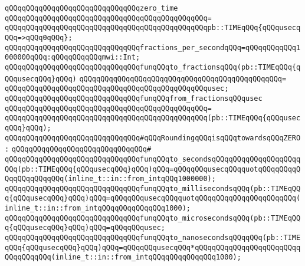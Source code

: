 \verb|qQQqqQQqqQQqqQQqqQQqqQQqqQQqqQQqzero_time|\newline
\verb|qQQqqQQqqQQqqQQqqQQqqQQqqQQqqQQqqQQqqQQqqQQqqQQq=|\newline
\verb|qQQqqQQqqQQqqQQqqQQqqQQqqQQqqQQqqQQqqQQqqQQqqQQqpb::TIMEqQQq{qQQqusecqQQq=>qQQq0qQQq};|\newline
\newline
\verb|qQQqqQQqqQQqqQQqqQQqqQQqqQQqqQQqfractions_per_secondqQQq=qQQqqQQqqQQq1000000qQQq:qQQqqQQqqQQqmwi::Int;|\newline
\newline
\verb|qQQqqQQqqQQqqQQqqQQqqQQqqQQqqQQqfunqQQqto_fractionsqQQq(pb::TIMEqQQq{qQQqusecqQQq}qQQq)|\newline
\verb|qQQqqQQqqQQqqQQqqQQqqQQqqQQqqQQqqQQqqQQqqQQqqQQq=|\newline
\verb|qQQqqQQqqQQqqQQqqQQqqQQqqQQqqQQqqQQqqQQqqQQqqQQqusec;|\newline
\newline
\verb|qQQqqQQqqQQqqQQqqQQqqQQqqQQqqQQqfunqQQqfrom_fractionsqQQqusec|\newline
\verb|qQQqqQQqqQQqqQQqqQQqqQQqqQQqqQQqqQQqqQQqqQQqqQQq=|\newline
\verb|qQQqqQQqqQQqqQQqqQQqqQQqqQQqqQQqqQQqqQQqqQQqqQQq(pb::TIMEqQQq{qQQqusecqQQq}qQQq);|\newline
\newline
\newline
\verb|qQQqqQQqqQQqqQQqqQQqqQQqqQQqqQQq#qQQqRoundingqQQqisqQQqtowardsqQQqZERO:|\newline
\verb|qQQqqQQqqQQqqQQqqQQqqQQqqQQqqQQq#|\newline
\verb|qQQqqQQqqQQqqQQqqQQqqQQqqQQqqQQqfunqQQqto_secondsqQQqqQQqqQQqqQQqqQQqqQQq(pb::TIMEqQQq{qQQqusecqQQq}qQQq)qQQq=qQQqqQQqusecqQQqquotqQQqqQQqqQQqqQQqqQQqqQQq(inline_t::in::from_intqQQq1000000);|\newline
\verb|qQQqqQQqqQQqqQQqqQQqqQQqqQQqqQQqfunqQQqto_millisecondsqQQq(pb::TIMEqQQq{qQQqusecqQQq}qQQq)qQQq=qQQqqQQqusecqQQqquotqQQqqQQqqQQqqQQqqQQqqQQq(inline_t::in::from_intqQQqqQQqqQQqqQQq1000);|\newline
\verb|qQQqqQQqqQQqqQQqqQQqqQQqqQQqqQQqfunqQQqto_microsecondsqQQq(pb::TIMEqQQq{qQQqusecqQQq}qQQq)qQQq=qQQqqQQqusec;|\newline
\verb|qQQqqQQqqQQqqQQqqQQqqQQqqQQqqQQqfunqQQqto_nanosecondsqQQqqQQq(pb::TIMEqQQq{qQQqusecqQQq}qQQq)qQQq=qQQqqQQqusecqQQq*qQQqqQQqqQQqqQQqqQQqqQQqqQQqqQQqqQQq(inline_t::in::from_intqQQqqQQqqQQqqQQq1000);|\newline
\newline
